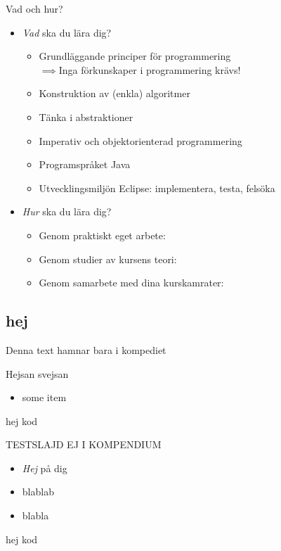 

\begin{Slide}{Vad och hur?}
\begin{itemize}
\item \emph{Vad} ska du lära dig?
\begin{itemize}
\item Grundläggande principer för programmering\\ $\implies$Inga förkunskaper i programmering krävs!
\item Konstruktion av (enkla) algoritmer
\item Tänka i abstraktioner
\item Imperativ och objektorienterad programmering
\item Programspråket Java
\item Utvecklingsmiljön Eclipse: implementera, testa, felsöka
\end{itemize}

\item \emph{Hur} ska du lära dig?
\begin{itemize}
\item Genom praktiskt eget arbete: 
\item Genom studier av kursens teori: 
\item Genom samarbete med dina kurskamrater: 
\end{itemize}
\end{itemize}
\end{Slide}


\ifkompendium
\subsection{hej}
Denna text hamnar bara i kompediet

Hejsan svejsan

\begin{itemize}
\item some item
\end{itemize}


\begin{Code}
hej kod
\end{Code}
\fi


\ifkompendium\else
\begin{Slide}{TESTSLAJD EJ I KOMPENDIUM}
\begin{itemize}
\item \emph{Hej} på dig
\item blablab
\item blabla
\end{itemize}
\begin{Code}
hej kod
\end{Code}
\end{Slide}
\fi


\ifkompendium\else
{} 
\fi